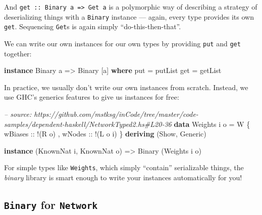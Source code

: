 \documentclass[]{article}
\newenvironment{Shaded}{}{}
\newcommand{\KeywordTok}[1]{\textcolor[rgb]{0.00,0.44,0.13}{\textbf{{#1}}}}
\newcommand{\DataTypeTok}[1]{\textcolor[rgb]{0.56,0.13,0.00}{{#1}}}
\newcommand{\CommentTok}[1]{\textcolor[rgb]{0.38,0.63,0.69}{\textit{{#1}}}}
\newcommand{\OtherTok}[1]{\textcolor[rgb]{0.00,0.44,0.13}{{#1}}}
\newcommand{\FunctionTok}[1]{\textcolor[rgb]{0.02,0.16,0.49}{{#1}}}
\newcommand{\NormalTok}[1]{{#1}}
\begin{document}
And \texttt{get\ ::\ Binary\ a\ =\textgreater{}\ Get\ a} is a polymorphic way of
describing a strategy of deserializing things with a \texttt{Binary} instance
--- again, every type provides its own \texttt{get}. Sequencing \texttt{Get}s is
again simply ``do-this-then-that''.

We can write our own instances for our own types by providing \texttt{put} and
\texttt{get} together:

\begin{Shaded}
\begin{Highlighting}[]
\KeywordTok{instance} \DataTypeTok{Binary} \NormalTok{a }\OtherTok{=>} \DataTypeTok{Binary} \NormalTok{[a] }\KeywordTok{where}
    \NormalTok{put }\FunctionTok{=} \NormalTok{putList}
    \NormalTok{get }\FunctionTok{=} \NormalTok{getList}
\end{Highlighting}
\end{Shaded}

In practice, we usually don't write our own instances from scratch. Instead, we
use GHC's generics features to give us instances for free:

\begin{Shaded}
\begin{Highlighting}[]
\CommentTok{-- source: https://github.com/mstksg/inCode/tree/master/code-samples/dependent-haskell/NetworkTyped2.hs#L20-36}
\KeywordTok{data} \DataTypeTok{Weights} \NormalTok{i o }\FunctionTok{=} \DataTypeTok{W} \NormalTok{\{}\OtherTok{ wBiases ::} \FunctionTok{!}\NormalTok{(}\DataTypeTok{R} \NormalTok{o)}
                     \NormalTok{,}\OtherTok{ wNodes  ::} \FunctionTok{!}\NormalTok{(}\DataTypeTok{L} \NormalTok{o i)}
                     \NormalTok{\}}
  \KeywordTok{deriving} \NormalTok{(}\DataTypeTok{Show}\NormalTok{, }\DataTypeTok{Generic}\NormalTok{)}

\KeywordTok{instance} \NormalTok{(}\DataTypeTok{KnownNat} \NormalTok{i, }\DataTypeTok{KnownNat} \NormalTok{o) }\OtherTok{=>} \DataTypeTok{Binary} \NormalTok{(}\DataTypeTok{Weights} \NormalTok{i o)}
\end{Highlighting}
\end{Shaded}

For simple types like \texttt{Weights}, which simply ``contain'' serializable
things, the \emph{binary} library is smart enough to write your instances
automatically for you!

\subsection{\texorpdfstring{\texttt{Binary} for
\texttt{Network}}{Binary for Network}}\label{binary-for-network}
\end{document}
